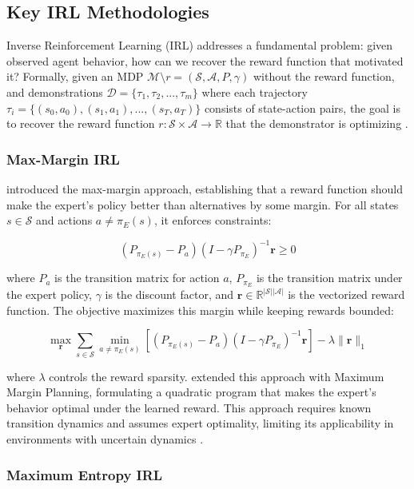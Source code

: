 \subsection{Key IRL Methodologies}

Inverse Reinforcement Learning (IRL) addresses a fundamental problem: given observed agent behavior, how can we recover the reward function that motivated it? Formally, given an MDP $\mathcal{M} \setminus r = (\mathcal{S}, \mathcal{A}, P, \gamma)$ without the reward function, and demonstrations $\mathcal{D} = \{\tau_1, \tau_2, ..., \tau_m\}$ where each trajectory $\tau_i = \{(s_0, a_0), (s_1, a_1), ..., (s_T, a_T)\}$ consists of state-action pairs, the goal is to recover the reward function $r: \mathcal{S} \times \mathcal{A} \to \mathbb{R}$ that the demonstrator is optimizing \citep{NgRussell2000}.

\subsubsection{Max-Margin IRL}

\citet{NgRussell2000} introduced the max-margin approach, establishing that a reward function should make the expert's policy better than alternatives by some margin. For all states $s \in \mathcal{S}$ and actions $a \neq \pi_E(s)$, it enforces constraints:

$$(P_{\pi_E(s)} - P_a)(I - \gamma P_{\pi_E})^{-1}\mathbf{r} \geq 0$$

\noindent where $P_a$ is the transition matrix for action $a$, $P_{\pi_E}$ is the transition matrix under the expert policy, $\gamma$ is the discount factor, and $\mathbf{r} \in \mathbb{R}^{|\mathcal{S}||\mathcal{A}|}$ is the vectorized reward function. The objective maximizes this margin while keeping rewards bounded:

$$\max_{\mathbf{r}} \sum_{s\in \mathcal{S}} \min_{a\neq\pi_E(s)} [(P_{\pi_E(s)} - P_a)(I - \gamma P_{\pi_E})^{-1}\mathbf{r}] - \lambda\|\mathbf{r}\|_1$$

\noindent where $\lambda$ controls the reward sparsity. \citet{Ratliff2006} extended this approach with Maximum Margin Planning, formulating a quadratic program that makes the expert's behavior optimal under the learned reward. This approach requires known transition dynamics and assumes expert optimality, limiting its applicability in environments with uncertain dynamics \citep{Abbeel2004}.

\subsubsection{Maximum Entropy IRL}

